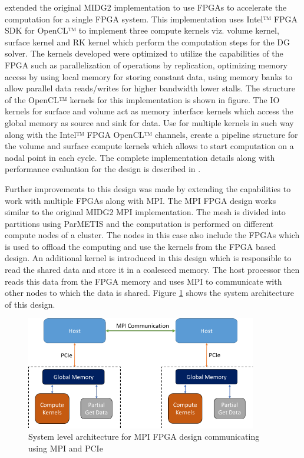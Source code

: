 \textcite{kenter_opencl-based_2018} extended the original MIDG2 implementation to use
FPGAs to accelerate the computation for a single FPGA system. This implementation
uses Intel™ FPGA SDK for OpenCL™ to implement three compute kernels viz. volume kernel,
surface kernel and RK kernel which perform the computation steps for the \ac{DG} solver.
The kernels developed were optimized to utilize the capabilities of the FPGA such
as parallelization of operations by replication, optimizing memory access by using
local memory for storing constant data, using memory banks to allow parallel data
reads/writes for higher bandwidth lower stalls. 
The structure of the OpenCL™ kernels for this implementation is shown in figure.
The IO kernels for surface and volume act as memory interface kernels which
access the global memory as source and sink for data. Use for multiple
kernels in such way along with the Intel™ FPGA OpenCL™
channels, create a pipeline structure for the volume and surface compute kernels
which allows to start computation on a nodal point in each cycle.
The complete implementation details along with
performance evaluation for the design is described in \cite{kenter_opencl-based_2018}.

Further improvements to this design was made by extending the capabilities to work
with multiple FPGAs along with \ac{MPI}. The \ac{MPI} FPGA design works similar to the original
MIDG2 \ac{MPI} implementation. The mesh is divided into partitions using ParMETIS and
the computation is performed on different compute nodes of a cluster. The nodes
in this case also include the FPGAs which is used to offload the computing and
use the kernels from the FPGA based design. An additional kernel is introduced in
this design which is responsible to read the shared data and store it in a coalesced
memory. The host processor then reads this data from the FPGA memory and uses
\ac{MPI} to communicate with other nodes to which the data is shared. Figure
\ref{fig:mpi_fpga} shows the system architecture of this design.

\begin{figure}[h]%
    \centering
    \includegraphics[width=0.9\textwidth]{images/mpi_fpga}
    \caption{System level architecture for MPI FPGA design communicating using MPI and PCIe}
    \label{fig:mpi_fpga}
\end{figure}

